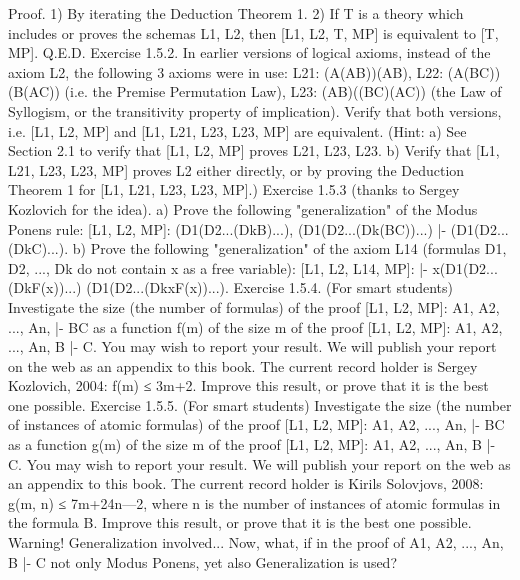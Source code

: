 Proof. 1) By iterating the Deduction Theorem 1.
2) If T is a theory which includes or proves the schemas L1, L2, then [L1, L2, T, MP] is equivalent to [T,
MP]. Q.E.D.
Exercise 1.5.2. In earlier versions of logical axioms, instead of the axiom L2, the following 3 axioms
were in use:
L21: (A\IMPLIES (A\IMPLIES B))\IMPLIES (A\IMPLIES B),
L22: (A\IMPLIES (B\IMPLIES C))\IMPLIES (B\IMPLIES (A\IMPLIES C)) (i.e. the Premise Permutation Law),
L23: (A\IMPLIES B)\IMPLIES ((B\IMPLIES C)\IMPLIES (A\IMPLIES C)) (the Law of Syllogism, or the transitivity property of implication).
Verify that both versions, i.e. [L1, L2, MP] and [L1, L21, L23, L23, MP] are equivalent. (Hint: a) See
Section 2.1 to verify that [L1, L2, MP] proves L21, L23, L23. b) Verify that [L1, L21, L23, L23, MP] proves
L2 either directly, or by proving the Deduction Theorem 1 for [L1, L21, L23, L23, MP].)
Exercise 1.5.3 (thanks to Sergey Kozlovich for the idea).
a) Prove the following "generalization" of the Modus Ponens rule:
[L1, L2, MP]: (D1\IMPLIES (D2\IMPLIES ...(Dk\IMPLIES B)...), (D1\IMPLIES (D2\IMPLIES ...(Dk\IMPLIES (B\IMPLIES C))...) |- (D1\IMPLIES (D2\IMPLIES ...(Dk\IMPLIES C)...).
b) Prove the following "generalization" of the axiom L14 (formulas D1, D2, ..., Dk do not contain x as a
free variable):
[L1, L2, L14, MP]: |- \forall x(D1\IMPLIES (D2\IMPLIES ...(Dk\IMPLIES F(x))...) \IMPLIES  (D1\IMPLIES (D2\IMPLIES ...(Dk\IMPLIES \forall xF(x))...).
Exercise 1.5.4. (For smart students) Investigate the size (the number of formulas) of the proof [L1, L2,
MP]: A1, A2, ..., An, |- B\IMPLIES C as a function f(m) of the size m of the proof [L1, L2, MP]: A1, A2, ..., An, B |-
C. You may wish to report your result. We will publish your report on the web as an appendix to this
book. The current record holder is Sergey Kozlovich, 2004: f(m) ≤ 3m+2. Improve this result, or prove
that it is the best one possible.
Exercise 1.5.5. (For smart students) Investigate the size (the number of instances of atomic formulas) of
the proof [L1, L2, MP]: A1, A2, ..., An, |- B\IMPLIES C as a function g(m) of the size m of the proof [L1, L2, MP]:
A1, A2, ..., An, B |- C. You may wish to report your result. We will publish your report on the web as an
appendix to this book. The current record holder is Kirils Solovjovs, 2008: g(m, n) ≤ 7m+24n---2, where n
is the number of instances of atomic formulas in the formula B. Improve this result, or prove that it is the
best one possible.
Warning! Generalization involved...
Now, what, if in the proof of A1, A2, ..., An, B |- C not only Modus Ponens, yet also Generalization is
used?
